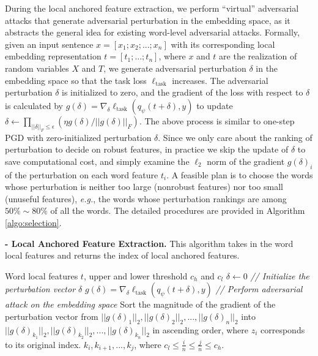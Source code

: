 \documentclass{article} \usepackage{iclr2021_conference,times}
\theoremstyle{definition}
\theoremstyle{remark}
\begin{document}
During the local anchored feature extraction, we perform ``virtual'' adversarial attacks that generate adversarial perturbation in the embedding space, as it abstracts the general idea for existing word-level adversarial attacks. Formally, given an input sentence $x=[x_1; x_2; ...; x_n]$ with its corresponding local embedding representation $t=[t_1; ...; t_n]$, where $x$ and $t$ are the realization of random variables $X$ and $T$, we generate adversarial perturbation $\delta$ in the embedding space so that the task loss $\ell_\text{task}$ increases. The adversarial perturbation $\delta$ is initialized to zero, and the gradient of the loss with respect to $\delta$ is calculated by $g({\delta}) = \nabla_\delta \ell_\text{task}(q_{\psi}({t} + \delta), y)$ to update $\delta \leftarrow \prod_{||\delta||_F \le \epsilon} ( \eta g(\delta) / ||g(\delta)||_F) $. The above process is similar to one-step PGD with zero-initialized perturbation $\delta$. Since we only care about the ranking of perturbation to decide on robust features, in practice we skip the update of $\delta$ to save computational cost, and simply examine the $\ell_2$ norm of the gradient $g({\delta})_i$ of the perturbation on each word feature ${t}_i$. A feasible plan is to choose the words whose perturbation is neither too large (nonrobust features) nor too small (unuseful features), \emph{e.g.}, the words whose perturbation rankings are among $50\% \sim 80\%$ of all the words. The detailed procedures are provided in Algorithm \ref{algo:selection}.
\begin{algorithm}[t]
\caption{\textbf{- Local Anchored Feature Extraction.} This algorithm takes in the word local features and returns the index of local anchored features.}
\label{algo:selection}
\begin{algorithmic}[1]
      Word local features $t$, upper and lower threshold $c_h$ and $c_l$
    \STATE $\delta \leftarrow 0$ \quad \emph{// Initialize the perturbation vector $\delta$}
    \STATE $g({\delta}) = \nabla_\delta \ell_\text{task}(q_{\psi}({t} + \delta), y)$ \quad \emph{// Perform adversarial attack on the embedding space}
    \STATE Sort the magnitude of the gradient of the perturbation vector from $||g({\delta})_1||_2, ||g({\delta})_2||_2, ..., ||g({\delta})_n||_2$ into $||g({\delta})_{k_1}||_2, ||g({\delta})_{k_2}||_2, ..., ||g({\delta})_{k_n}||_2$ in ascending order, where $z_i$ corresponds to its original index.
     $k_i, k_{i+1}, ..., k_{j}$, where $c_l \le \frac{i}{n} \le \frac{j}{n} \le c_h$.
\end{algorithmic}
\end{algorithm}
\end{document}
